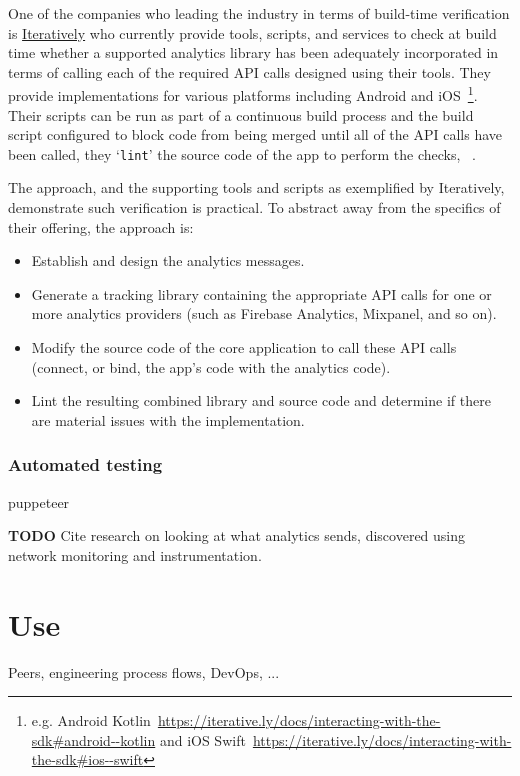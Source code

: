 One of the companies who leading the industry in terms of build-time verification is \href{https://iterative.ly}{Iteratively} who currently provide tools, scripts, and services to check at build time whether a supported analytics library has been adequately incorporated in terms of calling each of the required API calls designed using their tools. They provide implementations for various platforms including Android and iOS~\footnote{e.g. Android Kotlin~\url{https://iterative.ly/docs/interacting-with-the-sdk\#android--kotlin} and iOS Swift~\url{https://iterative.ly/docs/interacting-with-the-sdk\#ios--swift}}. Their scripts can be run as part of a continuous build process and the build script configured to block code from being merged until all of the API calls have been called, they `\texttt{lint}' the source code of the app to perform the checks, ~\cite{using_the_itly_cli_verify_the_instrumentation, using_the_itly_cli_itly_verify}.

The approach, and the supporting tools and scripts as exemplified by Iteratively, demonstrate such verification is practical. To abstract away from the specifics of their offering, the approach is:
\begin{itemize}
    \item Establish and design the analytics messages.
    \item Generate a tracking library containing the appropriate API calls for one or more analytics providers (such as Firebase Analytics, Mixpanel, and so on).
    \item Modify the source code of the core application to call these API calls (connect, or bind, the app's code with the analytics code).
    \item Lint the resulting combined library and source code and determine if there are material issues with the implementation.
\end{itemize}

\subsubsection{Automated testing}
puppeteer~\cite{using_puppeteer_to_automate_your_google_analytics_testing}

\textbf{TODO} Cite research on looking at what analytics sends, discovered using network monitoring and instrumentation. 





\section{Use}
Peers, engineering process flows, DevOps, ...

